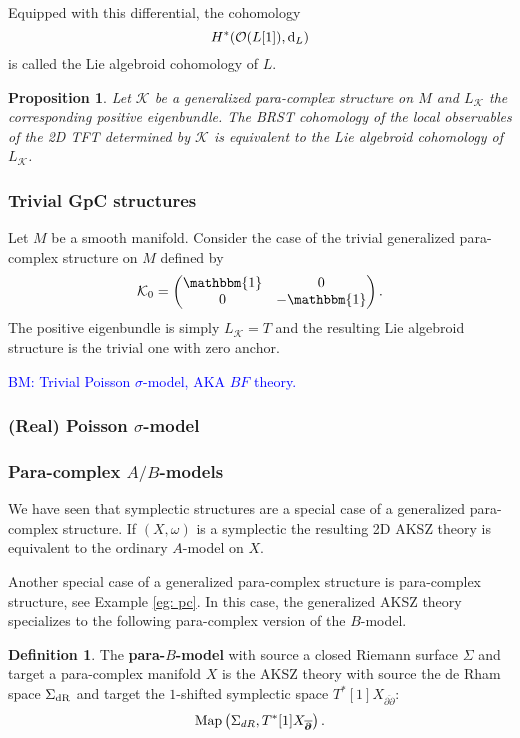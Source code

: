\documentclass{article}
\newcommand{\KK}{\mathcal{K}}
\newcommand{\cO}{\mathcal{O}}
\newcommand{\id}{\mathbbm{1}}
\newcommand{\p}{\partial}
\newcommand{\pd}{\overline{\p\!\!\!\p}}
\def\d{{\rm d}}
\newtheorem{proposition}[theorem]{Proposition}
\theoremstyle{definition}
\newtheorem{Def}[theorem]{Definition}
\theoremstyle{remark}
\def\brian{\textcolor{blue}{BM: }\textcolor{blue}}
\begin{document}
Equipped with this differential, the cohomology
\[
H^*( \cO(L[1]), \d_L )
\]
is called the Lie algebroid cohomology of $L$.

\begin{proposition}
Let $\KK$ be a generalized para-complex structure on $M$ and $L_{\KK}$ the corresponding positive eigenbundle. 
The BRST cohomology of the local observables of the 2D TFT determined by $\KK$ is equivalent to the Lie algebroid cohomology of $L_{\KK}$. 
\end{proposition}

\subsubsection*{Trivial GpC structures}

Let $M$ be a smooth manifold.
Consider the case of the trivial generalized para-complex structure on $M$ defined by
\begin{align*}
\KK_0=
\begin{pmatrix}
\id & 0 \\
0 & -\id
\end{pmatrix}.
\end{align*}
The positive eigenbundle is simply $L_\KK = T$ and the resulting Lie algebroid structure is the trivial one with zero anchor.

\brian{Trivial Poisson $\sigma$-model, AKA $BF$ theory.}

\subsubsection*{(Real) Poisson $\sigma$-model}



\subsubsection*{Para-complex $A/B$-models}

We have seen that symplectic structures are a special case of a generalized para-complex structure. 
If $(X, \omega)$ is a symplectic the resulting 2D AKSZ theory is equivalent to the ordinary $A$-model on $X$. 

Another special case of a generalized para-complex structure is para-complex structure, see Example \ref{eg: pc}. 
In this case, the generalized AKSZ theory specializes to the following para-complex version of the $B$-model.

\begin{Def}
The {\bf para-$B$-model} with source a closed Riemann surface $\Sigma$ and target a para-complex manifold $X$ is the AKSZ theory with source the de Rham space $\Sigma_{\rm dR}$ and target the $1$-shifted symplectic space $T^*[1] X_{\pd}$:
\[
{\rm Map}\left(\Sigma_{dR}, T^*[1]  X_{\pd}\right) .
\]
\end{Def}
\end{document}
